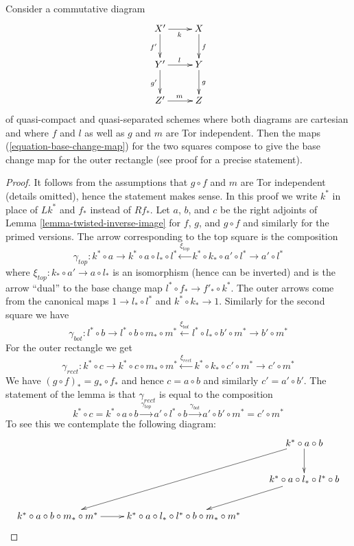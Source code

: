 \begin{lemma}
\label{lemma-compose-base-change-maps}
Consider a commutative diagram
$$
\xymatrix{
X' \ar[r]_k \ar[d]_{f'} & X \ar[d]^f \\
Y' \ar[r]^l \ar[d]_{g'} & Y \ar[d]^g \\
Z' \ar[r]^m & Z
}
$$
of quasi-compact and quasi-separated schemes where
both diagrams are cartesian and where $f$ and $l$
as well as $g$ and $m$ are Tor independent.
Then the maps (\ref{equation-base-change-map})
for the two squares compose to give the base
change map for the outer rectangle (see proof for a precise statement).
\end{lemma}

\begin{proof}
It follows from the assumptions that $g \circ f$ and $m$ are Tor
independent (details omitted), hence the statement makes sense.
In this proof we write $k^*$ in place of $Lk^*$ and $f_*$ instead
of $Rf_*$. Let $a$, $b$, and $c$ be the right adjoints of
Lemma \ref{lemma-twisted-inverse-image}
for $f$, $g$, and $g \circ f$ and similarly for the primed versions.
The arrow corresponding to the top square is the composition
$$
\gamma_{top} :
k^* \circ a \to k^* \circ a \circ l_* \circ l^*
\xleftarrow{\xi_{top}} k^* \circ k_* \circ a' \circ l^* \to a' \circ l^*
$$
where $\xi_{top} : k_* \circ a' \to a \circ l_*$
is an isomorphism (hence can be inverted)
and is the arrow ``dual'' to the base change map
$l^* \circ f_* \to f'_* \circ k^*$. The outer arrows come
from the canonical maps $1 \to l_* \circ l^*$ and $k^* \circ k_* \to 1$.
Similarly for the second square we have
$$
\gamma_{bot} :
l^* \circ b \to l^* \circ b \circ m_* \circ m^*
\xleftarrow{\xi_{bot}} l^* \circ l_* \circ b' \circ m^* \to b' \circ m^*
$$
For the outer rectangle we get
$$
\gamma_{rect} :
k^* \circ c \to k^* \circ c \circ m_* \circ m^*
\xleftarrow{\xi_{rect}} k^* \circ k_* \circ c' \circ m^* \to c' \circ m^*
$$
We have $(g \circ f)_* = g_* \circ f_*$ and hence
$c = a \circ b$ and similarly $c' = a' \circ b'$.
The statement of the lemma is that $\gamma_{rect}$
is equal to the composition
$$
k^* \circ c = k^* \circ a \circ b \xrightarrow{\gamma_{top}}
a' \circ l^* \circ b \xrightarrow{\gamma_{bot}}
a' \circ b' \circ m^* = c' \circ m^*
$$
To see this we contemplate the following diagram:
$$
\xymatrix{
& & k^* \circ a \circ b \ar[d] \ar[lldd] \\
& & k^* \circ a \circ l_* \circ l^* \circ b \ar[ld] \\
k^* \circ a \circ b \circ m_* \circ m^* \ar[r] &
k^* \circ a \circ l_* \circ l^* \circ b \circ m_* \circ m^* &
}$$
\end{proof}
